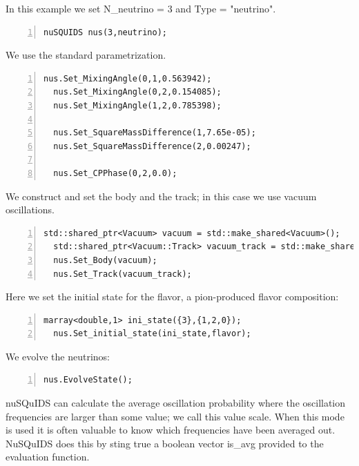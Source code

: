\documentclass[3p,12pt]{elsarticle}
\newcommand{\ttf}{\ttfamily}
\begin{document}
In this example we set {\ttf N\_neutrino = 3} and {\ttf Type = "neutrino"}.

\begin{lstlisting}[frame=leftline, numbers =
  left,breaklines=true,label = ex:sin1]
  nuSQUIDS nus(3,neutrino);
\end{lstlisting}

We use the standard parametrization.

\begin{lstlisting}[frame=leftline, numbers =
  left,breaklines=true,label = ex:sin1]
  nus.Set_MixingAngle(0,1,0.563942);
  nus.Set_MixingAngle(0,2,0.154085);
  nus.Set_MixingAngle(1,2,0.785398);

  nus.Set_SquareMassDifference(1,7.65e-05);
  nus.Set_SquareMassDifference(2,0.00247);
  
  nus.Set_CPPhase(0,2,0.0);
\end{lstlisting}

We construct and set the body and the track; in this case we use vacuum
oscillations.

\begin{lstlisting}[frame=leftline, numbers =
  left,breaklines=true,label = ex:sin1]
  std::shared_ptr<Vacuum> vacuum = std::make_shared<Vacuum>();
  std::shared_ptr<Vacuum::Track> vacuum_track = std::make_shared<Vacuum::Track>(1.e3*units.kparsec);
  nus.Set_Body(vacuum);
  nus.Set_Track(vacuum_track);
\end{lstlisting}

Here we set the initial state for the flavor, a pion-produced flavor composition:

\begin{lstlisting}[frame=leftline, numbers =
  left,breaklines=true,label = ex:sin1]
  marray<double,1> ini_state({3},{1,2,0});
  nus.Set_initial_state(ini_state,flavor);
\end{lstlisting}

We evolve the neutrinos:

\begin{lstlisting}[frame=leftline, numbers =
  left,breaklines=true,label = ex:sin1]
  nus.EvolveState();
\end{lstlisting}

{\ttf nuSQuIDS} can calculate the average oscillation probability
where the oscillation frequencies are larger than some value;
we call this value {\ttf scale}. When this mode is used it is often
valuable to know which frequencies have been averaged out.
NuSQuIDS does this by sting true a boolean vector {\ttf is\_avg} provided to the
evaluation function.
\end{document}
